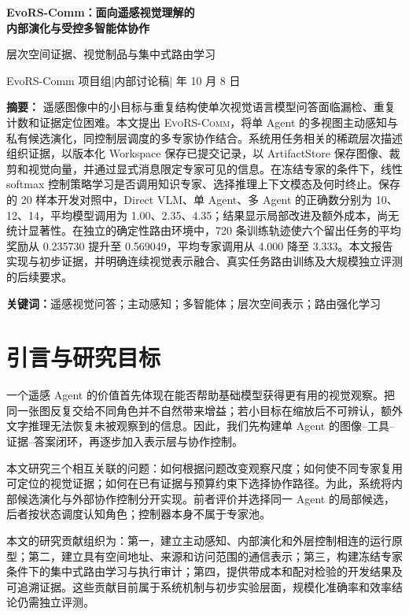 \documentclass[UTF8,a4paper,zihao=5,fontset=fandol]{ctexart}
\newcommand{\ours}{\textsc{EvoRS-Comm}}
\begin{document}
\begin{center}
{\LARGE\bfseries\color{ink}EvoRS-Comm：面向遥感视觉理解的\\[4pt]内部演化与受控多智能体协作}\par
\vspace{5pt}
{\large 层次空间证据、视觉制品与集中式路由学习}\par
\vspace{6pt}
{\small EvoRS-Comm 项目组\quad |\quad 内部讨论稿\quad | 年 10 月 8 日}
\end{center}
\vspace{2pt}
\noindent\textbf{摘要：}
遥感图像中的小目标与重复结构使单次视觉语言模型问答面临漏检、重复计数和证据定位困难。本文提出 \ours，将单 Agent 的多视图主动感知与私有候选演化，同控制层调度的多专家协作结合。系统用任务相关的稀疏层次描述组织证据，以版本化 Workspace 保存已提交记录，以 ArtifactStore 保存图像、裁剪和视觉向量，并通过显式消息限定专家可见的信息。在冻结专家的条件下，线性 softmax 控制策略学习是否调用知识专家、选择推理上下文模态及何时终止。保存的 20 样本开发对照中，Direct VLM、单 Agent、多 Agent 的正确数分别为 10、12、14，平均模型调用为 1.00、2.35、4.35；结果显示局部改进及额外成本，尚无统计显著性。在独立的确定性路由环境中，720 条训练轨迹使六个留出任务的平均奖励从 0.235730 提升至 0.569049，平均专家调用从 4.000 降至 3.333。本文报告实现与初步证据，并明确连续视觉表示融合、真实任务路由训练及大规模独立评测的后续要求。

\noindent\textbf{关键词：}遥感视觉问答；主动感知；多智能体；层次空间表示；路由强化学习

\section{引言与研究目标}
一个遥感 Agent 的价值首先体现在能否帮助基础模型获得更有用的视觉观察。把同一张图反复交给不同角色并不自然带来增益；若小目标在缩放后不可辨认，额外文字推理无法恢复未被观察到的信息。因此，我们先构建单 Agent 的图像--工具--证据--答案闭环，再逐步加入表示层与协作控制。

本文研究三个相互关联的问题：如何根据问题改变观察尺度；如何使不同专家复用可定位的视觉证据；如何在已有证据与预算约束下选择协作路径。为此，系统将内部候选演化与外部协作控制分开实现。前者评价并选择同一 Agent 的局部候选，后者按状态调度认知角色；控制器本身不属于专家池。

本文的研究贡献组织为：第一，建立主动感知、内部演化和外层控制相连的运行原型；第二，建立具有空间地址、来源和访问范围的通信表示；第三，构建冻结专家条件下的集中式路由学习与执行审计；第四，提供带成本和配对检验的开发结果及可追溯证据。这些贡献目前属于系统机制与初步实验层面，规模化准确率和效率结论仍需独立评测。
\end{document}
